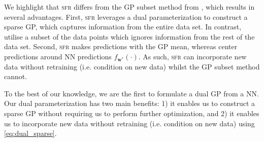 \documentclass{article}
\newcommand{\our}{\textsc{sfr}\xspace}
\newcommand{\mbf}[1]{\mathbf{#1}}
\newcommand{\vw}{\mbf{w}}
\begin{document}
We highlight that \our differs from the GP subset method from \citet{immer2021improving}, which results in several advantages.
First, \our leverages a dual parameterization to construct a sparse GP, which captures information from the entire data set.
In contrast, \citet{immer2021improving} utilise a subset of the data points which ignores information from the rest of the data set.
Second, \our makes predictions with the GP mean, whereas \citet{immer2021improving} center predictions around NN predictions $f_{\vw^*}(\cdot)$.
As such, \our can incorporate new data without retraining (i.e. condition on new data) whilst the GP subset method cannot.

To the best of our knowledge, we are the first to formulate a dual GP from a NN.
Our dual parameterization has two main benefits: 1) it enables us to construct a sparse GP without requiring us to perform further optimization, and 2)
it enables us to incorporate new data without retraining (i.e. condition on new data) using \cref{eq:dual_sparse}.






\end{document}
